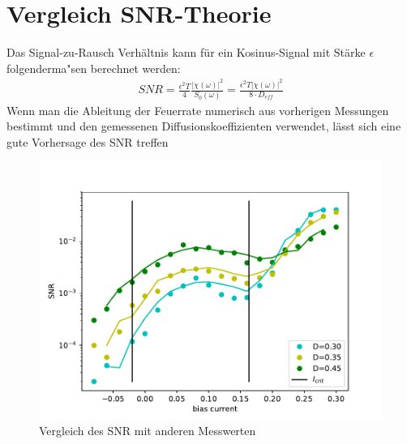 \documentclass[12pt,a4paper]{article}
\begin{document}

\thispagestyle{empty}
\newpage
\tableofcontents
\thispagestyle{empty}
\newpage
{}

\section{Vergleich SNR-Theorie}
Das Signal-zu-Rausch Verhältnis kann für ein Kosinus-Signal mit Stärke $\epsilon$ folgenderma"sen berechnet werden:
\begin{align*}
SNR=\frac{\epsilon ^2T}{4}\frac{|\chi(\omega)|^2}{S_0(\omega)}=\frac{\epsilon^2T|\chi(\omega)|^2}{8\cdot D_{eff}}
\end{align*}
Wenn man die Ableitung der Feuerrate numerisch aus vorherigen Messungen bestimmt und den gemessenen Diffusionskoeffizienten verwendet, lässt sich eine gute Vorhersage des SNR treffen

\begin{figure}[H]
	\centering
	\includegraphics[scale=0.9]{snrangerealanameassp.pdf}
	\caption{Vergleich des SNR mit anderen Messwerten}
	\label{snrspike}
\end{figure}
\end{document}
